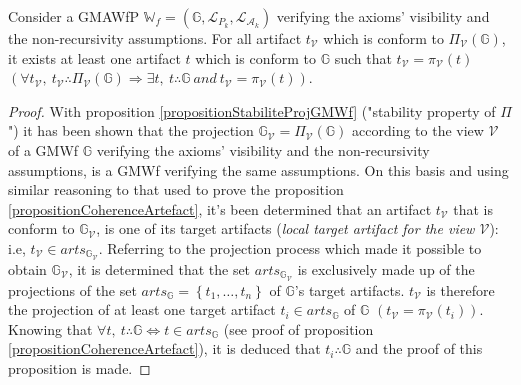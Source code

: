\begin{proposition}
	\label{propositionReciproqueCoherenceArtefact}
	Consider a GMAWfP $\mathbb{W}_f=\left(\mathbb{G}, \mathcal{L}_{P_k}, \mathcal{L}_{\mathcal{A}_k} \right)$ verifying the axioms' visibility and the non-recursivity assumptions. For all artifact $t_{\mathcal{V}}$ which is conform to $\Pi_{\mathcal{V}}\left(\mathbb{G} \right)$, it exists at least one artifact $t$ which is conform to $\mathbb{G}$ such that $t_{\mathcal{V}}=\pi_{\mathcal{V}}\left(t\right)$ $\left(\forall t_{\mathcal{V}}, ~t_{\mathcal{V}} \therefore \Pi_{\mathcal{V}}\left(\mathbb{G} \right) \Rightarrow \exists t, ~t \therefore \mathbb{G} ~and~ t_{\mathcal{V}}=\pi_{\mathcal{V}}\left(t\right) \right)$.
\end{proposition}

\begin{proof}
	With proposition \ref{propositionStabiliteProjGMWf} ("stability property of $\Pi$") it has been shown that the projection $\mathbb{G}_{\mathcal{V}} = \Pi_{\mathcal{V}}\left(\mathbb{G} \right)$ according to the view $\mathcal{V}$ of a GMWf $\mathbb{G}$ verifying the axioms' visibility and the non-recursivity assumptions, is a GMWf verifying the same assumptions. On this basis and using similar reasoning to that used to prove the proposition \ref{propositionCoherenceArtefact}, it's been determined that an artifact $t_{\mathcal{V}}$ that is conform to $\mathbb{G}_{\mathcal{V}}$, is one of its target artifacts (\textit{local target artifact for the view $\mathcal{V}$}): i.e, $t_{\mathcal{V}} \in arts_{\mathbb{G}_{\mathcal{V}}}$. Referring to the projection process which made it possible to obtain $\mathbb{G}_{\mathcal{V}}$, it is determined that the set $arts_{\mathbb{G}_{\mathcal{V}}}$ is exclusively made up of the projections of the set $arts_{\mathbb{G}}=\left\{t_1,\ldots,t_n\right\}$ of $\mathbb{G}$'s target artifacts. $t_{\mathcal{V}}$ is therefore the projection of at least one target artifact $t_i \in arts_{\mathbb{G}}$ of $\mathbb{G}$ $\left(t_{\mathcal{V}}=\pi_{\mathcal{V}}\left(t_i\right)\right)$. Knowing that $\forall t, ~t \therefore \mathbb{G} \Leftrightarrow t \in arts_{\mathbb{G}}$ (see proof of proposition \ref{propositionCoherenceArtefact}), it is deduced that $t_i \therefore \mathbb{G}$ and the proof of this proposition is made.
\end{proof}


